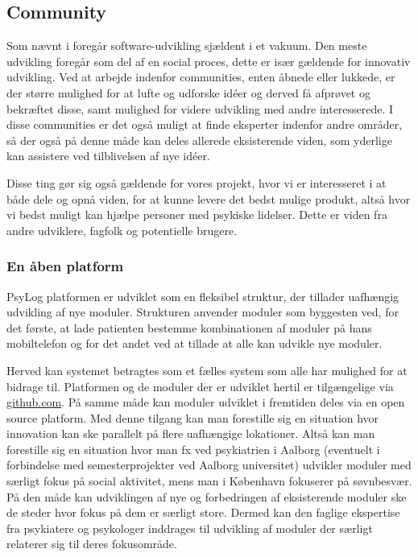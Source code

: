 \subsection{Community}
Som nævnt i \citet[Kapitel 2]{book:softwareinnovation} foregår software-udvikling sjældent i et vakuum.
Den meste udvikling foregår som del af en social proces, dette er især gældende for innovativ udvikling.
Ved at arbejde indenfor communities, enten åbnede eller lukkede, er der større mulighed for at lufte og udforske idéer og derved få afprøvet og bekræftet disse, samt mulighed for videre udvikling med andre interesserede.
I disse communities er det også muligt at finde eksperter indenfor andre områder, så der også på denne måde kan deles allerede eksisterende viden, som yderlige kan assistere ved tilblivelsen af nye idéer.

Disse ting gør sig også gældende for vores projekt, hvor vi er interesseret i at både dele og opnå viden, for at kunne levere det bedst mulige produkt, altså hvor vi bedst muligt kan hjælpe personer med psykiske lidelser.
Dette er viden fra andre udviklere, fagfolk og potentielle brugere.

\subsubsection{En åben platform}
PsyLog platformen er udviklet som en fleksibel struktur, der tillader uafhængig udvikling af nye moduler.
Strukturen anvender moduler som byggesten ved, for det første, at lade patienten bestemme kombinationen af moduler på hans mobiltelefon og for det andet ved at tillade at alle kan udvikle nye moduler.

Herved kan systemet betragtes som et fælles system som alle har mulighed for at bidrage til.
Platformen og de moduler der er udviklet hertil er tilgængelige via \href{http://github.com}{github.com}.
På samme måde kan moduler udviklet i fremtiden deles via en open source platform.
Med denne tilgang kan man forestille sig en situation hvor innovation kan ske parallelt på flere uafhængige lokationer.
Altså kan man forestille sig en situation hvor man fx ved psykiatrien i Aalborg (eventuelt i forbindelse med semesterprojekter ved Aalborg universitet) udvikler moduler med særligt fokus på social aktivitet, mens man i København fokuserer på søvnbesvær.
På den måde kan udviklingen af nye og forbedringen af eksisterende moduler ske de steder hvor fokus på dem er særligt store.
Dermed kan den faglige ekspertise fra psykiatere og psykologer inddrages til udvikling af moduler der særligt relaterer sig til deres fokusområde.

